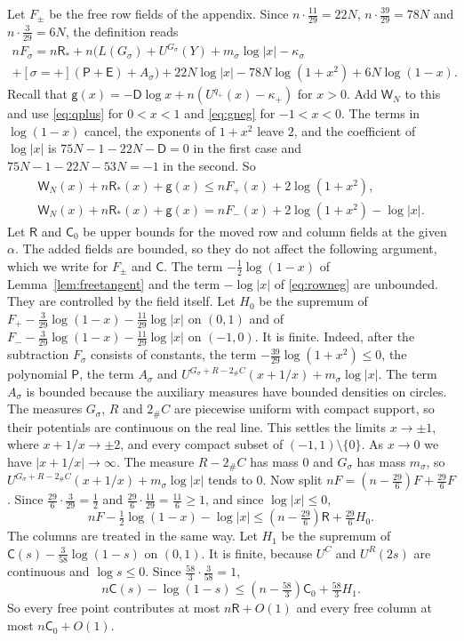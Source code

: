 \documentclass[11pt]{amsart}
\theoremstyle{definition}
\theoremstyle{remark}
\numberwithin{equation}{section}
\begin{document}
Let $F_\pm$ be the free row fields of the appendix. Since $n\cdot\frac{11}{29}=22N$, $n\cdot\frac{39}{29}=78N$ and $n\cdot\frac3{29}=6N$, the definition reads
\begin{multline*}
 nF_\sigma=n\mathsf R_*+n\bigl(L(G_\sigma)+U^{G_\sigma}(Y)+m_\sigma\log|x|-\kappa_\sigma\\
 +[\sigma=+](\mathsf P+\mathsf E)+A_\sigma\bigr)+22N\log|x|-78N\log(1+x^2)+6N\log(1-x).
\end{multline*}
Recall that $\mathsf g(x)=-\mathsf D\log x+n(U^{q_+}(x)-\kappa_+)$ for $x>0$. Add $\mathsf W_N$ to this and use \eqref{eq:qplus} for $0<x<1$ and \eqref{eq:gneg} for $-1<x<0$. The terms in $\log(1-x)$
cancel, the exponents of $1+x^2$ leave $2$, and the coefficient of $\log|x|$ is $75N-1-22N-\mathsf D=0$ in the first case and $75N-1-22N-53N=-1$ in the second. So
\begin{gather}
 \mathsf W_N(x)+n\mathsf R_*(x)+\mathsf g(x)\le nF_+(x)+2\log(1+x^2),\label{eq:rowpos}\\
 \mathsf W_N(x)+n\mathsf R_*(x)+\mathsf g(x)=nF_-(x)+2\log(1+x^2)-\log|x|.\label{eq:rowneg}
\end{gather}
Let $\mathsf R$ and $\mathsf C_0$ be upper bounds for the moved row and column fields at the given $\alpha$. The added fields are bounded, so they do not affect the following argument, which we write for $F_\pm$ and $\mathsf C$.
The term $-\frac12\log(1-x)$ of Lemma~\ref{lem:freetangent} and the term $-\log|x|$ of \eqref{eq:rowneg} are unbounded. They are controlled by the field itself. Let $H_0$ be the supremum of $F_+-\frac3{29}\log(1-x)-\frac{11}{29}\log|x|$ on $(0,1)$ and of $F_--\frac3{29}\log(1-x)-\frac{11}{29}\log|x|$ on $(-1,0)$. It is finite.
Indeed, after the subtraction $F_\sigma$ consists of constants, the term $-\frac{39}{29}\log(1+x^2)\le0$, the polynomial $\mathsf P$, the term $A_\sigma$ and
$U^{G_\sigma+R-2_\#C}(x+1/x)+m_\sigma\log|x|$. The term $A_\sigma$ is bounded because the auxiliary measures have bounded densities on circles. The measures $G_\sigma$, $R$ and $2_\#C$
are piecewise uniform with compact support, so their potentials are continuous on the real line. This settles the limits $x\to\pm1$, where $x+1/x\to\pm2$, and every compact subset of
$(-1,1)\setminus\{0\}$. As $x\to0$ we have $|x+1/x|\to\infty$. The measure $R-2_\#C$ has mass $0$ and $G_\sigma$ has mass $m_\sigma$, so $U^{G_\sigma+R-2_\#C}(x+1/x)+m_\sigma\log|x|$ tends to $0$.
Now split $nF=(n-\frac{29}6)F+\frac{29}6F$. Since $\frac{29}6\cdot\frac3{29}=\frac12$ and $\frac{29}6\cdot\frac{11}{29}=\frac{11}6\ge1$, and since $\log|x|\le0$,
\[
 nF-\tfrac12\log(1-x)-\log|x|\le(n-\tfrac{29}6)\mathsf R+\tfrac{29}6H_0 .
\]
The columns are treated in the same way. Let $H_1$ be the supremum of $\mathsf C(s)-\frac3{58}\log(1-s)$ on $(0,1)$. It is finite, because $U^C$ and $U^R(2s)$ are continuous and
$\log s\le0$. Since $\frac{58}3\cdot\frac3{58}=1$,
\[
 n\mathsf C(s)-\log(1-s)\le(n-\tfrac{58}3)\mathsf C_0+\tfrac{58}3H_1 .
\]
So every free point contributes at most $n\mathsf R+O(1)$ and every free column at most $n\mathsf C_0+O(1)$. 
\end{document}
